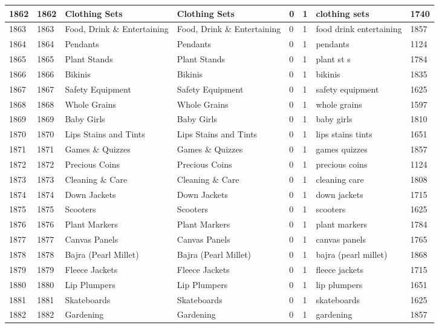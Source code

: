 \begin{longtable}{|l|l|l|l|l|l|l|l|}
1862 & 1862 & Clothing Sets & Clothing Sets & 0 & 1 & clothing sets & 1740 \\ \hline 
1863 & 1863 & Food, Drink \& Entertaining & Food, Drink \& Entertaining & 0 & 1 & food drink entertaining & 1857 \\ \hline 
1864 & 1864 & Pendants & Pendants & 0 & 1 & pendants & 1124 \\ \hline 
1865 & 1865 & Plant Stands & Plant Stands & 0 & 1 & plant st s & 1784 \\ \hline 
1866 & 1866 & Bikinis & Bikinis & 0 & 1 & bikinis & 1835 \\ \hline 
1867 & 1867 & Safety Equipment & Safety Equipment & 0 & 1 & safety equipment & 1625 \\ \hline 
1868 & 1868 & Whole Grains & Whole Grains & 0 & 1 & whole grains & 1597 \\ \hline 
1869 & 1869 & Baby Girls & Baby Girls & 0 & 1 & baby girls & 1810 \\ \hline 
1870 & 1870 & Lips Stains and Tints & Lips Stains and Tints & 0 & 1 & lips stains tints & 1651 \\ \hline 
1871 & 1871 & Games \& Quizzes & Games \& Quizzes & 0 & 1 & games quizzes & 1857 \\ \hline 
1872 & 1872 & Precious Coins & Precious Coins & 0 & 1 & precious coins & 1124 \\ \hline 
1873 & 1873 & Cleaning \& Care & Cleaning \& Care & 0 & 1 & cleaning care & 1808 \\ \hline 
1874 & 1874 & Down Jackets & Down Jackets & 0 & 1 & down jackets & 1715 \\ \hline 
1875 & 1875 & Scooters & Scooters & 0 & 1 & scooters & 1625 \\ \hline 
1876 & 1876 & Plant Markers & Plant Markers & 0 & 1 & plant markers & 1784 \\ \hline 
1877 & 1877 & Canvas Panels & Canvas Panels & 0 & 1 & canvas panels & 1765 \\ \hline 
1878 & 1878 & Bajra (Pearl Millet) & Bajra (Pearl Millet) & 0 & 1 & bajra (pearl millet) & 1868 \\ \hline 
1879 & 1879 & Fleece Jackets & Fleece Jackets & 0 & 1 & fleece jackets & 1715 \\ \hline 
1880 & 1880 & Lip Plumpers & Lip Plumpers & 0 & 1 & lip plumpers & 1651 \\ \hline 
1881 & 1881 & Skateboards & Skateboards & 0 & 1 & skateboards & 1625 \\ \hline 
1882 & 1882 & Gardening & Gardening & 0 & 1 & gardening & 1857 \\ \hline 

\end{longtable}
